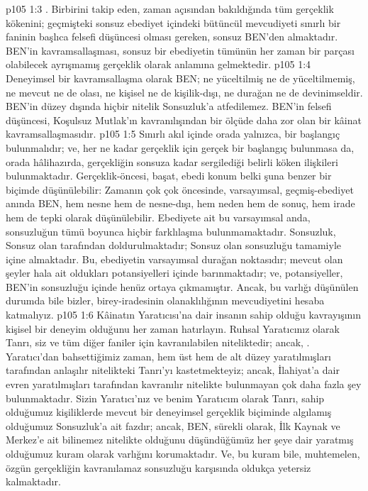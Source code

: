 \vs p105 1:3 . Birbirini takip eden, zaman açısından bakıldığında tüm gerçeklik kökenini; geçmişteki sonsuz ebediyet içindeki bütüncül mevcudiyeti sınırlı bir faninin başlıca felsefi düşüncesi olması gereken, sonsuz BEN’den almaktadır. BEN’in kavramsallaşması, sonsuz bir ebediyetin tümünün her zaman bir parçası olabilecek ayrışmamış gerçeklik olarak  anlamına gelmektedir.
\vs p105 1:4 Deneyimsel bir kavramsallaşma olarak BEN; ne yüceltilmiş ne de yüceltilmemiş, ne mevcut ne de olası, ne kişisel ne de kişilik\hyp{}dışı, ne durağan ne de devinimseldir. BEN’in  düzey dışında hiçbir nitelik Sonsuzluk’a atfedilemez. BEN’in felsefi düşüncesi, Koşulsuz Mutlak’ın kavranılışından bir ölçüde daha zor olan bir kâinat kavramsallaşmasıdır.
\vs p105 1:5 Sınırlı akıl içinde orada yalnızca, bir başlangıç bulunmalıdır; ve, her ne kadar gerçeklik için gerçek bir başlangıç bulunmasa da, orada hâlihazırda, gerçekliğin sonsuza kadar sergilediği belirli köken ilişkileri bulunmaktadır. Gerçeklik\hyp{}öncesi, başat, ebedi konum belki şuna benzer bir biçimde düşünülebilir: Zamanın çok çok öncesinde, varsayımsal, geçmiş\hyp{}ebediyet anında BEN, hem nesne hem de nesne\hyp{}dışı, hem neden hem de sonuç, hem irade hem de tepki olarak düşünülebilir. Ebediyete ait bu varsayımsal anda, sonsuzluğun tümü boyunca hiçbir farklılaşma bulunmamaktadır. Sonsuzluk, Sonsuz olan tarafından doldurulmaktadır; Sonsuz olan sonsuzluğu tamamiyle içine almaktadır. Bu, ebediyetin varsayımsal durağan noktasıdır; mevcut olan şeyler hala ait oldukları potansiyelleri içinde barınmaktadır; ve, potansiyeller, BEN’in sonsuzluğu içinde henüz ortaya çıkmamıştır. Ancak, bu varlığı düşünülen durumda bile bizler, birey\hyp{}iradesinin olanaklılığının mevcudiyetini hesaba katmalıyız.
\vs p105 1:6 Kâinatın Yaratıcısı’na dair insanın sahip olduğu kavrayışının kişisel bir deneyim olduğunu her zaman hatırlayın. Ruhsal Yaratıcınız olarak Tanrı, siz ve tüm diğer faniler için kavranılabilen niteliktedir; ancak, . Yaratıcı’dan bahsettiğimiz zaman, hem üst hem de alt düzey yaratılmışları tarafından anlaşılır nitelikteki Tanrı’yı kastetmekteyiz; ancak, İlahiyat’a dair evren yaratılmışları tarafından kavranılır nitelikte bulunmayan çok daha fazla şey bulunmaktadır. Sizin Yaratıcı’nız ve benim Yaratıcım olarak Tanrı, sahip olduğumuz kişiliklerde mevcut bir deneyimsel gerçeklik biçiminde algılamış olduğumuz Sonsuzluk’a ait fazdır; ancak, BEN, sürekli olarak, İlk Kaynak ve Merkez’e ait bilinemez nitelikte olduğunu düşündüğümüz her şeye dair yaratmış olduğumuz kuram olarak varlığını korumaktadır. Ve, bu kuram bile, muhtemelen, özgün gerçekliğin kavranılamaz sonsuzluğu karşısında oldukça yetersiz kalmaktadır.
